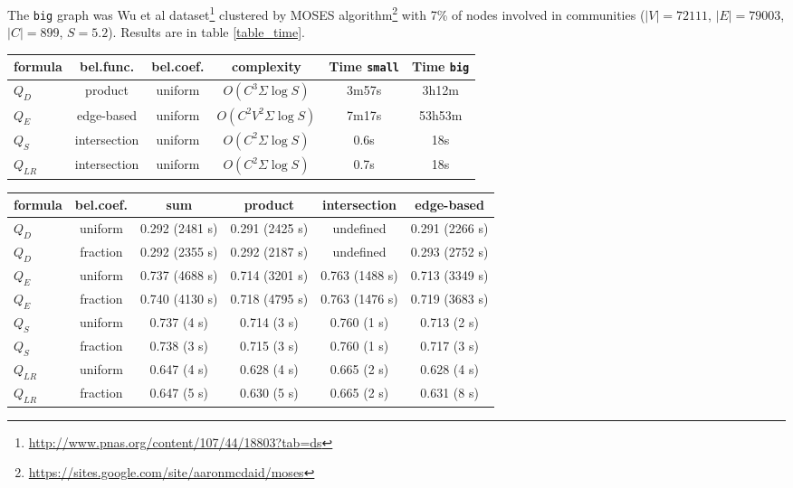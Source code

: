 \documentclass[a4paper,twocolumn]{article}
\begin{document}
The \texttt{big} graph was Wu et al dataset\footnote{\url{http://www.pnas.org/content/107/44/18803?tab=ds}} clustered by MOSES algorithm\footnote{\url{https://sites.google.com/site/aaronmcdaid/moses}} with 7\% of nodes involved in communities ($|V| = 72111$, $|E| = 79003$, $|C|=899$, $S=5.2$). Results are in table \ref{table_time}.

\begin{table*}[h!]
\centering
\caption{\label{table_time}Modularity value and computation time for $Q_S$, $Q_{LR}$, $Q_D$ and $Q_E$ on 2 undirected unweighted graphs.}
\begin{tabular}{|l|c|c|c|c|c|}
\hline
\textbf{formula} & \textbf{bel.func.} & \textbf{bel.coef.} & \textbf{complexity} & \textbf{Time \texttt{small}} & \textbf{Time \texttt{big}} \\
\hline
$Q_D$ & product & uniform & $O(C^3 \Sigma \log S)$ & 3m57s & 3h12m \\
\hline
$Q_E$ & edge-based & uniform & $O(C^2 V^2 \Sigma \log S)$ & 7m17s & 53h53m \\
\hline
$Q_S$ & intersection & uniform & $O(C^2 \Sigma \log S)$ & 0.6s & 18s \\
\hline
$Q_{LR}$ & intersection & uniform & $O(C^2 \Sigma \log S)$ & 0.7s & 18s \\
\hline
\end{tabular}
\end{table*}

\begin{table*}[h]
\centering
\caption{\label{table_bfbc}Comparison of different belonging functions and belonging coefficients for $Q_D$, $Q_E$, $Q_S$ and $Q_{LR}$ on undirected unweighted graph with $|V|=72146$, $|E|=79003$, $|C|=1894$, $S=5.30$ (clustered by Clique Percolation).}
\begin{tabular}{|l|c|c|c|c|c|}
\hline
\textbf{formula} & \textbf{bel.coef.} & \textbf{sum} & \textbf{product} & \textbf{intersection} & \textbf{edge-based} \\
\hline
$Q_D$ & uniform & 0.292 (2481 s) & 0.291 (2425 s) & undefined & 0.291 (2266 s) \\
\hline
$Q_D$ & fraction & 0.292 (2355 s) & 0.292 (2187 s) & undefined & 0.293 (2752 s) \\
\hline
\hline
$Q_E$ & uniform & 0.737 (4688 s) & 0.714 (3201 s) & 0.763 (1488 s) & 0.713 (3349 s) \\
\hline
$Q_E$ & fraction & 0.740 (4130 s) & 0.718 (4795 s) & 0.763 (1476 s) & 0.719 (3683 s) \\
\hline
\hline
$Q_S$ & uniform & 0.737 (4 s) & 0.714 (3 s) & 0.760 (1 s) & 0.713 (2 s) \\
\hline
$Q_S$ & fraction & 0.738 (3 s) & 0.715 (3 s) & 0.760 (1 s) & 0.717 (3 s) \\
\hline
\hline
$Q_{LR}$ & uniform & 0.647 (4 s) & 0.628 (4 s) & 0.665 (2 s) & 0.628 (4 s) \\
\hline
$Q_{LR}$ & fraction & 0.647 (5 s) & 0.630 (5 s) & 0.665 (2 s) & 0.631 (8 s) \\
\hline
\end{tabular}
\end{table*}
\end{document}
